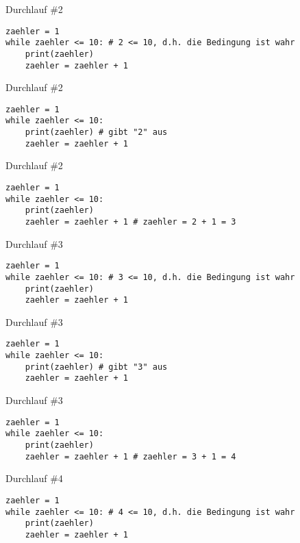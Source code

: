 \documentclass{\VorlagenPfad/coderdojokabeamer}
\begin{document}

\begin{frame}[fragile]{Durchlauf \#2}
	\begin{verbatim}
zaehler = 1
while zaehler <= 10: # 2 <= 10, d.h. die Bedingung ist wahr
	print(zaehler)
	zaehler = zaehler + 1
	\end{verbatim}
\end{frame}

\begin{frame}[fragile]{Durchlauf \#2}
	\begin{verbatim}
zaehler = 1
while zaehler <= 10:
	print(zaehler) # gibt "2" aus
	zaehler = zaehler + 1
	\end{verbatim}
\end{frame}

\begin{frame}[fragile]{Durchlauf \#2}
	\begin{verbatim}
zaehler = 1
while zaehler <= 10:
	print(zaehler)
	zaehler = zaehler + 1 # zaehler = 2 + 1 = 3
	\end{verbatim}
\end{frame}


\begin{frame}[fragile]{Durchlauf \#3}
	\begin{verbatim}
zaehler = 1
while zaehler <= 10: # 3 <= 10, d.h. die Bedingung ist wahr
	print(zaehler)
	zaehler = zaehler + 1
	\end{verbatim}
\end{frame}


\begin{frame}[fragile]{Durchlauf \#3}
	\begin{verbatim}
zaehler = 1
while zaehler <= 10:
	print(zaehler) # gibt "3" aus
	zaehler = zaehler + 1
	\end{verbatim}
\end{frame}

\begin{frame}[fragile]{Durchlauf \#3}
	\begin{verbatim}
zaehler = 1
while zaehler <= 10:
	print(zaehler)
	zaehler = zaehler + 1 # zaehler = 3 + 1 = 4
	\end{verbatim}
\end{frame}



\begin{frame}[fragile]{Durchlauf \#4}
	\begin{verbatim}
zaehler = 1
while zaehler <= 10: # 4 <= 10, d.h. die Bedingung ist wahr
	print(zaehler)
	zaehler = zaehler + 1
	\end{verbatim}
\end{frame}
\end{document}

